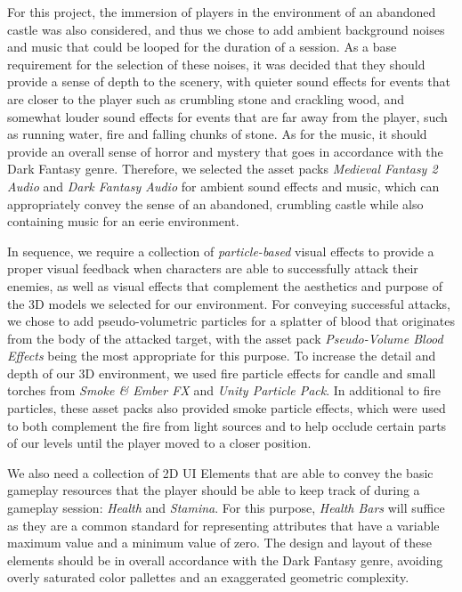 For this project, the immersion of players in the environment of an abandoned castle was also considered, and thus we chose to add ambient background noises and music that could be looped for the duration of a session. As a base requirement for the selection of these noises, it was decided that they should provide a sense of depth to the scenery, with quieter sound effects for events that are closer to the player such as crumbling stone and crackling wood, and somewhat louder sound effects for events that are far away from the player, such as running water, fire and falling chunks of stone. As for the music, it should provide an overall sense of horror and mystery that goes in accordance with the Dark Fantasy genre. Therefore, we selected the asset packs \emph{Medieval Fantasy 2 Audio} and \emph{Dark Fantasy Audio} for ambient sound effects and music, which can appropriately convey the sense of an abandoned, crumbling castle while also containing music for an eerie environment.


In sequence, we require a collection of \emph{particle-based} visual effects to provide a proper visual feedback when characters are able to successfully attack their enemies, as well as visual effects that complement the aesthetics and purpose of the 3D models we selected for our environment. For conveying successful attacks, we chose to add pseudo-volumetric particles for a splatter of blood that originates from the body of the attacked target, with the asset pack \emph{Pseudo-Volume Blood Effects} being the most appropriate for this purpose. To increase the detail and depth of our 3D environment, we used fire particle effects for candle and small torches from \emph{Smoke \& Ember FX} and \emph{Unity Particle Pack}. In additional to fire particles, these asset packs also provided smoke particle effects, which were used to both complement the fire from light sources and to help occlude certain parts of our levels until the player moved to a closer position.

We also need a collection of 2D UI Elements that are able to convey the basic gameplay resources that the player should be able to keep track of during a gameplay session: \emph{Health} and \emph{Stamina}. For this purpose, \emph{Health Bars} will suffice as they are a common standard for representing attributes that have a variable maximum value and a minimum value of zero. The design and layout of these elements should be in overall accordance with the Dark Fantasy genre, avoiding overly saturated color pallettes and an exaggerated geometric complexity.

